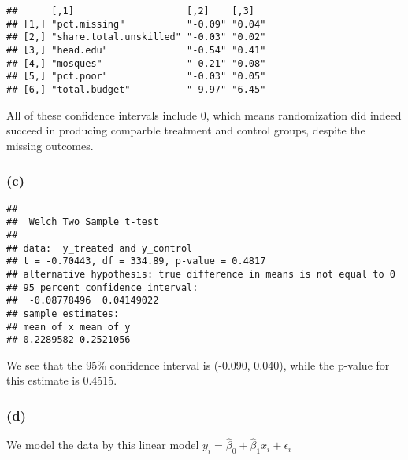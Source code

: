 \documentclass[]{article}
\newenvironment{Shaded}{\begin{snugshade}}{\end{snugshade}}
\newcommand{\DecValTok}[1]{\textcolor[rgb]{0.00,0.00,0.81}{#1}}
\newcommand{\KeywordTok}[1]{\textcolor[rgb]{0.13,0.29,0.53}{\textbf{#1}}}
\newcommand{\NormalTok}[1]{#1}
\newcommand{\OperatorTok}[1]{\textcolor[rgb]{0.81,0.36,0.00}{\textbf{#1}}}
\newcommand{\StringTok}[1]{\textcolor[rgb]{0.31,0.60,0.02}{#1}}
\begin{document}
\begin{verbatim}
##      [,1]                    [,2]    [,3]  
## [1,] "pct.missing"           "-0.09" "0.04"
## [2,] "share.total.unskilled" "-0.03" "0.02"
## [3,] "head.edu"              "-0.54" "0.41"
## [4,] "mosques"               "-0.21" "0.08"
## [5,] "pct.poor"              "-0.03" "0.05"
## [6,] "total.budget"          "-9.97" "6.45"
\end{verbatim}

All of these confidence intervals include 0, which means randomization
did indeed succeed in producing comparble treatment and control groups,
despite the missing outcomes.

\hypertarget{c-2}{%
\subsubsection{(c)}\label{c-2}}

\begin{Shaded}
\end{Shaded}

\begin{verbatim}
## 
##  Welch Two Sample t-test
## 
## data:  y_treated and y_control
## t = -0.70443, df = 334.89, p-value = 0.4817
## alternative hypothesis: true difference in means is not equal to 0
## 95 percent confidence interval:
##  -0.08778496  0.04149022
## sample estimates:
## mean of x mean of y 
## 0.2289582 0.2521056
\end{verbatim}

We see that the 95\% confidence interval is (-0.090, 0.040), while the
p-value for this estimate is 0.4515.

\hypertarget{d-2}{%
\subsubsection{(d)}\label{d-2}}

We model the data by this linear model
\(y_i = \hat{\beta}_0 + \hat{\beta}_1x_i + \epsilon_i\)
\end{document}
